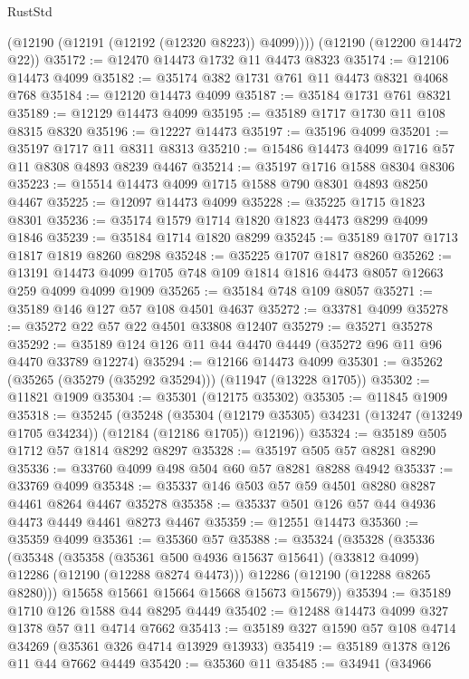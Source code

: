 \begin{lexlean}{RustStd}
\begin{coremodule}
        (@12190 (@12191 (@12192 (@12320 @8223)) @4099))))
    (@12190 (@12200 @14472 @22))
@35172 := @12470 @14473 @1732 @11 @4473 @8323
@35174 := @12106 @14473 @4099
@35182 := @35174 @382 @1731 @761 @11 @4473 @8321 @4068 @768
@35184 := @12120 @14473 @4099
@35187 := @35184 @1731 @761 @8321
@35189 := @12129 @14473 @4099
@35195 := @35189 @1717 @1730 @11 @108 @8315 @8320
@35196 := @12227 @14473
@35197 := @35196 @4099
@35201 := @35197 @1717 @11 @8311 @8313
@35210 := @15486 @14473 @4099 @1716 @57 @11 @8308 @4893 @8239 @4467
@35214 := @35197 @1716 @1588 @8304 @8306
@35223 := @15514 @14473 @4099 @1715 @1588 @790 @8301 @4893 @8250 @4467
@35225 := @12097 @14473 @4099
@35228 := @35225 @1715 @1823 @8301
@35236 := @35174 @1579 @1714 @1820 @1823 @4473 @8299 @4099 @1846
@35239 := @35184 @1714 @1820 @8299
@35245 := @35189 @1707 @1713 @1817 @1819 @8260 @8298
@35248 := @35225 @1707 @1817 @8260
@35262 := @13191 @14473 @4099 @1705 @748 @109 @1814 @1816 @4473 @8057 @12663 @259 @4099 @4099 @1909
@35265 := @35184 @748 @109 @8057
@35271 := @35189 @146 @127 @57 @108 @4501 @4637
@35272 := @33781 @4099
@35278 := @35272 @22 @57 @22 @4501 @33808 @12407
@35279 := @35271 @35278
@35292 := @35189 @124 @126 @11 @44 @4470 @4449 (@35272 @96 @11 @96 @4470 @33789 @12274)
@35294 := @12166 @14473 @4099
@35301 := @35262 (@35265 (@35279 (@35292 @35294))) (@11947 (@13228 @1705))
@35302 := @11821 @1909
@35304 := @35301 (@12175 @35302)
@35305 := @11845 @1909
@35318 := @35245
    (@35248
      (@35304 (@12179 @35305) @34231 (@13247 (@13249 @1705 @34234)) (@12184 (@12186 @1705)) @12196))
@35324 := @35189 @505 @1712 @57 @1814 @8292 @8297
@35328 := @35197 @505 @57 @8281 @8290
@35336 := @33760 @4099 @498 @504 @60 @57 @8281 @8288 @4942
@35337 := @33769 @4099
@35348 := @35337 @146 @503 @57 @59 @4501 @8280 @8287 @4461 @8264 @4467 @35278
@35358 := @35337 @501 @126 @57 @44 @4936 @4473 @4449 @4461 @8273 @4467
@35359 := @12551 @14473
@35360 := @35359 @4099
@35361 := @35360 @57
@35388 := @35324
    (@35328
      (@35336
        (@35348
          (@35358
            (@35361 @500 @4936 @15637 @15641)
            (@33812 @4099)
            @12286
            (@12190 (@12288 @8274 @4473)))
          @12286
          (@12190 (@12288 @8265 @8280)))
        @15658
        @15661
        @15664
        @15668
        @15673
        @15679))
@35394 := @35189 @1710 @126 @1588 @44 @8295 @4449
@35402 := @12488 @14473 @4099 @327 @1378 @57 @11 @4714 @7662
@35413 := @35189 @327 @1590 @57 @108 @4714 @34269 (@35361 @326 @4714 @13929 @13933)
@35419 := @35189 @1378 @126 @11 @44 @7662 @4449
@35420 := @35360 @11
@35485 := @34941
    (@34966

\end{coremodule}
\end{lexlean}
